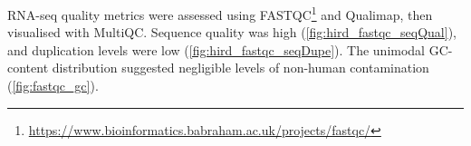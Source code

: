 
RNA-seq quality metrics were assessed using FASTQC\footnote{\url{https://www.bioinformatics.babraham.ac.uk/projects/fastqc/}} and Qualimap\autocite{okonechnikov2015QualimapAdvancedMultisample}, then visualised with MultiQC\autocite{ewels2016MultiQCSummarizeAnalysis}.
Sequence quality was high (\autoref{fig:hird_fastqc_seqQual}), and duplication levels were low (\autoref{fig:hird_fastqc_seqDupe}).
The unimodal GC-content distribution suggested negligible levels of non-human contamination (\autoref{fig:fastqc_gc}).

